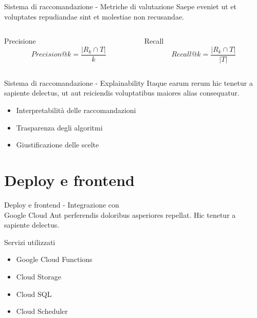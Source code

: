 \documentclass{beamer}
\begin{document}
	\begin{frame}{Sistema di raccomandazione - Metriche di valutazione}
		Saepe eveniet ut et voluptates repudiandae sint et molestiae non recusandae.

		\begin{columns}
			\begin{column}{0.5\textwidth}
				\begin{block}{Precisione}
					$$ Precision@k = \frac{|R_k \cap T|}{k} $$
				\end{block}
			\end{column}
			\begin{column}{0.5\textwidth}
				\begin{block}{Recall}
					$$ Recall@k = \frac{|R_k \cap T|}{|T|} $$
				\end{block}
			\end{column}
		\end{columns}
	\end{frame}

	\begin{frame}{Sistema di raccomandazione - Explainability}
		Itaque earum rerum hic tenetur a sapiente delectus, ut aut reiciendis voluptatibus maiores alias consequatur.

		\begin{itemize}
			\item Interpretabilità delle raccomandazioni
			\item Trasparenza degli algoritmi
			\item Giustificazione delle scelte
		\end{itemize}
	\end{frame}


	\section{Deploy e frontend}

	\begin{frame}{Deploy e frontend - Integrazione con\\ Google Cloud}
		Aut perferendis doloribus asperiores repellat. Hic tenetur a sapiente delectus.

		\begin{block}{Servizi utilizzati}
			\begin{itemize}
				\item Google Cloud Functions
				\item Cloud Storage
				\item Cloud SQL
				\item Cloud Scheduler
			\end{itemize}
		\end{block}
	\end{frame}
\end{document}
